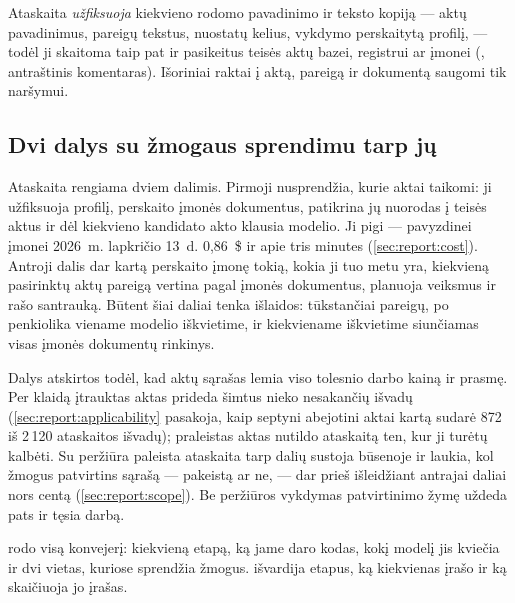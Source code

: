 Ataskaita \emph{užfiksuoja} kiekvieno rodomo pavadinimo ir teksto kopiją --- aktų
pavadinimus, pareigų tekstus, nuostatų kelius, vykdymo perskaitytą profilį, --- todėl ji
skaitoma taip pat ir pasikeitus teisės aktų bazei, registrui ar įmonei
(, antraštinis komentaras). Išoriniai raktai į aktą, pareigą ir
dokumentą saugomi tik naršymui.

\subsection{Dvi dalys su žmogaus sprendimu tarp jų}

Ataskaita rengiama dviem dalimis. Pirmoji nusprendžia, kurie aktai taikomi: ji užfiksuoja
profilį, perskaito įmonės dokumentus, patikrina jų nuorodas į teisės aktus ir dėl kiekvieno
kandidato akto klausia modelio. Ji pigi --- pavyzdinei įmonei 2026~m. lapkričio 13~d. 0,86~\$
ir apie tris minutes (\cref{sec:report:cost}). Antroji dalis dar kartą perskaito įmonę tokią,
kokia ji tuo metu yra, kiekvieną pasirinktų aktų pareigą
vertina pagal įmonės dokumentus, planuoja veiksmus ir rašo santrauką. Būtent šiai daliai tenka
išlaidos: tūkstančiai pareigų, po penkiolika viename modelio iškvietime, ir kiekviename
iškvietime siunčiamas visas įmonės dokumentų rinkinys.

Dalys atskirtos todėl, kad aktų sąrašas lemia viso tolesnio darbo kainą ir prasmę. Per klaidą
įtrauktas aktas prideda šimtus nieko nesakančių išvadų (\cref{sec:report:applicability}
pasakoja, kaip septyni abejotini aktai kartą sudarė 872 iš 2\,120 ataskaitos išvadų); praleistas
aktas nutildo ataskaitą ten, kur ji turėtų kalbėti. Su peržiūra paleista ataskaita tarp dalių
sustoja būsenoje  ir laukia, kol žmogus patvirtins sąrašą --- pakeistą ar
ne, --- dar prieš išleidžiant antrajai daliai nors centą (\cref{sec:report:scope}). Be peržiūros
vykdymas patvirtinimo žymę uždeda pats ir tęsia darbą.

 rodo visą konvejerį: kiekvieną etapą, ką jame daro kodas, kokį
modelį jis kviečia ir dvi vietas, kuriose sprendžia žmogus.  išvardija
etapus, ką kiekvienas įrašo ir ką skaičiuoja jo įrašas.

